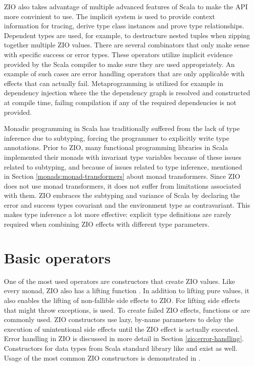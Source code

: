 ZIO also takes advantage of multiple advanced features of Scala to make the API more convinient to use. The implicit system is used to provide context information for tracing, derive type class instances and prove type relationships. Dependent types are used, for example, to destructure nested tuples when zipping together multiple ZIO values. There are several combinators that only make sense with specific success or error types. These operators utilize implicit evidence provided by the Scala compiler to make sure they are used appropriately. An example of such cases are error handling operators that are only applicable with effects that can actually fail. Metaprogramming is utilized for example in dependency injection where the the dependency graph is resolved and constructed at compile time, failing compilation if any of the required dependencies is not provided.

Monadic programming in Scala has traditionally suffered from the lack of type inference due to subtyping, forcing the programmer to explicitly write type annotations. Prior to ZIO, many functional programming libraries in Scala implemented their monads with invariant type variables because of these issues related to subtyping, and because of issues related to type inference, mentioned in Section \ref{monads:monad-transformers} about monad transformers. Since ZIO does not use monad transformers, it does not suffer from limitations associated with them. ZIO embraces the subtyping and variance of Scala by declaring the error and success types covariant and the environment type as contravariant. This makes type inference a lot more effective: explicit type definitions are rarely required when combining ZIO effects with different type parameters.



\section{Basic operators}
One of the most used operators are constructors that create ZIO values. Like every monad, ZIO also has a lifting function . In addition to lifting pure values, it also enables the lifting of non-fallible side effects to ZIO. For lifting side effects that might throw exceptions,  is used. To create failed ZIO effects, functions  or  are commonly used. ZIO constructors use lazy, by-name parameters to delay the execution of unintentional side effects until the ZIO effect is actually executed.  Error handling in ZIO is discussed in more detail in Section \ref{zio:error-handling}. Constructors for data types from Scala standard library like  and  exist as well. Usage of the most common ZIO constructors is demonstrated in .


